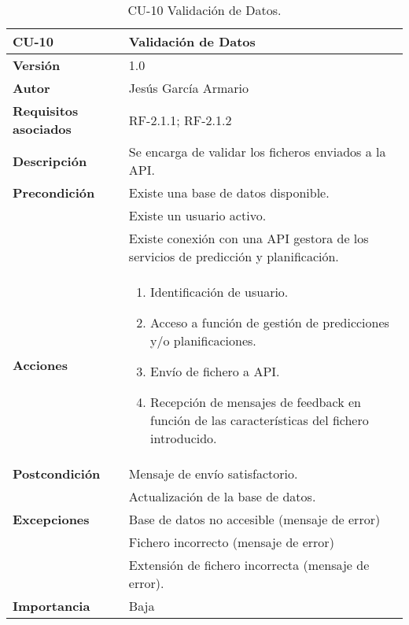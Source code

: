 \begin{table}[p]
	\centering
	\begin{tabularx}{\linewidth}{ p{} p{} }
		\toprule
		\textbf{CU-10}    & \textbf{Validación de Datos}\\
		\toprule
		\textbf{Versión}              & 1.0    \\
		\textbf{Autor}                & Jesús García Armario \\
		\textbf{Requisitos asociados} & RF-2.1.1; RF-2.1.2 \\
		\textbf{Descripción}          & Se encarga de validar los ficheros enviados a la API. \\
		\textbf{Precondición}         & Existe una base de datos disponible. \\
  & Existe un usuario activo.\\
  & Existe conexión con una API gestora de los servicios de predicción y planificación.\\
		\textbf{Acciones}             &
		\begin{enumerate}
			\def\labelenumi{\arabic{enumi}.}
			\tightlist
			\item Identificación de usuario.
   \item Acceso a función de gestión de predicciones y/o planificaciones.
   \item Envío de fichero a API.
   \item Recepción de mensajes de feedback en función de las características del fichero introducido.
\end{enumerate}\\
		\textbf{Postcondición}        &  Mensaje de envío satisfactorio. \\
  & Actualización de la base de datos.\\
		\textbf{Excepciones}          & Base de datos no accesible (mensaje de error)\\
  & Fichero incorrecto (mensaje de error)\\
  & Extensión de fichero incorrecta (mensaje de error).\\
		\textbf{Importancia}          & Baja \\
		\bottomrule
	\end{tabularx}
	\caption{CU-10 Validación de Datos.}
 \end{table}


